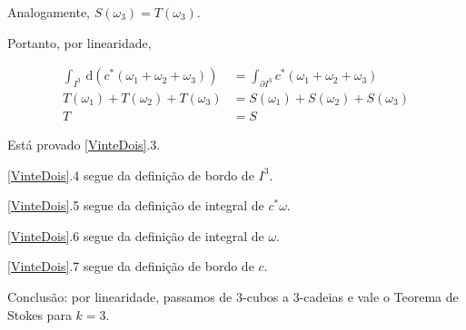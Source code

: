 \documentclass[12pt,a4paper]{article}
\begin{document}
		Analogamente, $S(\omega_3) = T(\omega_3)$.
		
		Portanto, por linearidade,
		
		\begin{align}
			\int_{I^3} \,\mathrm{d}(c^*(\omega_1 + \omega_2 + \omega_3)) &= \int_{\partial I^3} c^*(\omega_1 + \omega_2 + \omega_3) \\
			T(\omega_1) + T(\omega_2) + T(\omega_3) &= S(\omega_1) + S(\omega_2) + S(\omega_3) \\
			T &= S
		\end{align}		
		
		Est\'a provado \ref{VinteDois}.3.
		
		\ref{VinteDois}.4 segue da defini\c{c}\~ao de bordo de $I^3$.
		
		\ref{VinteDois}.5 segue da defini\c{c}\~ao de integral de $c^*\omega$.
		
		\ref{VinteDois}.6 segue da defini\c{c}\~ao de integral de $\omega$.
		
		\ref{VinteDois}.7 segue da defini\c{c}\~ao de bordo de $c$.		
		
		Conclus\~ao: por linearidade, passamos de $3$-cubos a $3$-cadeias e vale o Teorema de Stokes para $k = 3$.
		
\end{document}
